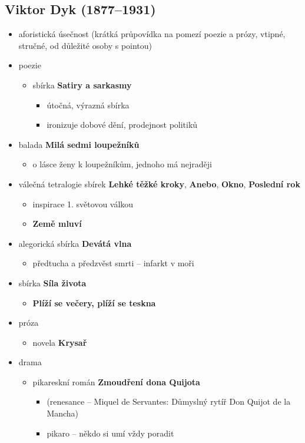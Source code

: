 \subsection{Viktor Dyk (1877--1931)}
\begin{itemize}
\item aforistická úsečnost (krátká průpovídka na pomezí poezie a prózy, vtipné, stručné, od důležité osoby s pointou)
\item poezie
	\begin{itemize}
	\item sbírka \textbf{Satiry a sarkasmy}
		\begin{itemize}
		\item útočná, výrazná sbírka
		\item ironizuje dobové dění, prodejnost politiků
		\end{itemize}
	\end{itemize}
	\item balada \textbf{Milá sedmi loupežníků}
		\begin{itemize}
		\item o lásce ženy k loupežníkům, jednoho má nejraději
		\end{itemize}
	\item válečná tetralogie sbírek \textbf{Lehké těžké kroky}, \textbf{Anebo}, \textbf{Okno}, \textbf{Poslední rok}
		\begin{itemize}
		\item inspirace 1. světovou válkou
		\item \textbf{Země mluví}
		\end{itemize}
	\item alegorická sbírka \textbf{Devátá vlna}
		\begin{itemize}
		\item předtucha a předzvěst smrti -- infarkt v moři
		\end{itemize}
	\item sbírka \textbf{Síla života}
		\begin{itemize}
		\item \textbf{Plíží se večery, plíží se teskna}
		\end{itemize}
\item próza
	\begin{itemize}
	\item novela \textbf{Krysař}
	\end{itemize}
\item drama
	\begin{itemize}
	\item pikareskní román \textbf{Zmoudření dona Quijota}
	\begin{itemize}
	\item (renesance -- Miquel de Servantes: Důmyslný rytíř Don Quijot de la Mancha)
	\item pikaro -- někdo si umí vždy poradit
	\end{itemize}
	\end{itemize}
\end{itemize}
